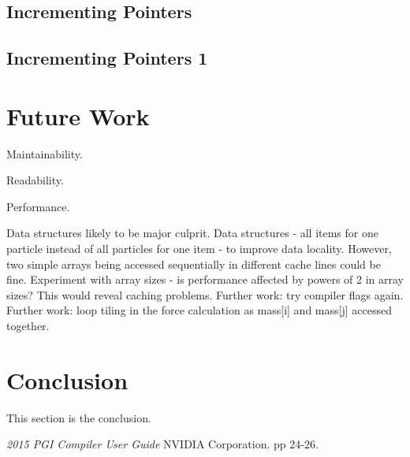 \documentclass[11pt, oneside]{article}   %
\begin{document}
\subsection{Incrementing Pointers}
\subsection{Incrementing Pointers 1}

\section{Future Work}

Maintainability.

Readability.

Performance.

Data structures likely to be major culprit.
Data structures - all items for one particle instead of all particles for one item - to improve data locality.  However, two simple arrays being accessed sequentially in different cache lines could be fine.
Experiment with array sizes - is performance affected by powers of 2 in array sizes?  This would reveal caching problems.  
Further work: try compiler flags again.
Further work: loop tiling in the force calculation as mass[i] and mass[j] accessed together.


\section{Conclusion}
This section is the conclusion.

\begin{thebibliography}{100}

 {\em 2015 PGI Compiler User Guide} NVIDIA Corporation. pp 24-26.

\end{thebibliography}
\end{document}
